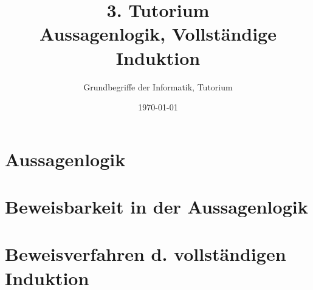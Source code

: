 




\title[Aussagenlogik, Vollständige Induktion]{3. Tutorium\\ Aussagenlogik, Vollständige Induktion}
\subtitle{Grundbegriffe der Informatik, Tutorium \hashtag\mytutnumber}
\date{\today}
\usepackage{tikz}


\titleframe







\roadmap

\section{Aussagenlogik}



\section{Beweisbarkeit in der Aussagenlogik}




\section[Vollständige Induktion]{Beweisverfahren d. vollständigen Induktion}

